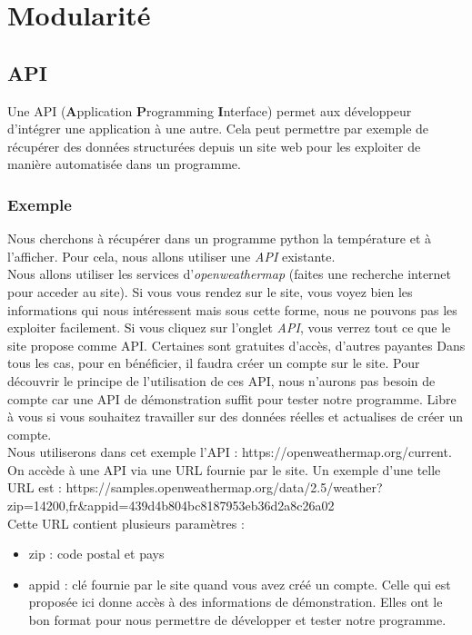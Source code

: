 \documentclass[12pt,fleqn]{book} %
\begin{document}
\chapter*{Modularité}
\section{API}
\begin{definition}
	Une API (\textbf{A}pplication \textbf{P}rogramming \textbf{I}nterface) permet aux développeur d'intégrer une application à une autre. Cela peut permettre par exemple de récupérer des données structurées depuis un site web pour les exploiter de manière automatisée dans un programme. 
\end{definition}

\subsection{Exemple}
Nous cherchons à récupérer dans un programme python la température et à l'afficher. Pour cela, nous allons utiliser une \textit{API} existante.\\

Nous allons utiliser les services d'\textit{openweathermap} (faites une recherche internet pour acceder au site). Si vous vous rendez sur le site, vous voyez bien les informations qui nous intéressent mais sous cette forme, nous ne pouvons pas les exploiter facilement. Si vous cliquez sur l'onglet \textit{API}, vous verrez tout ce que le site propose comme API. Certaines sont gratuites d'accès, d'autres payantes Dans tous les cas, pour en bénéficier, il faudra créer un compte sur le site. Pour découvrir le principe de l'utilisation de ces API, nous n'aurons pas besoin de compte car une API de démonstration suffit pour tester notre programme. Libre à vous si vous souhaitez travailler sur des données réelles et actualises de créer un compte.\\ 

Nous utiliserons dans cet exemple l'API : https://openweathermap.org/current. \\

On accède à une API via une URL fournie par le site. Un exemple d'une telle URL est : https://samples.openweathermap.org/data/2.5/weather?zip=14200,fr&appid=439d4b804bc8187953eb36d2a8c26a02 \\

Cette URL contient plusieurs paramètres : 
\begin{itemize}
	\item zip : code postal et pays
	\item appid : clé fournie par le site quand vous avez créé un compte. Celle qui est proposée ici donne accès à des informations de démonstration. Elles ont le bon format pour nous permettre de développer et tester notre programme.
\end{itemize}
\end{document}
